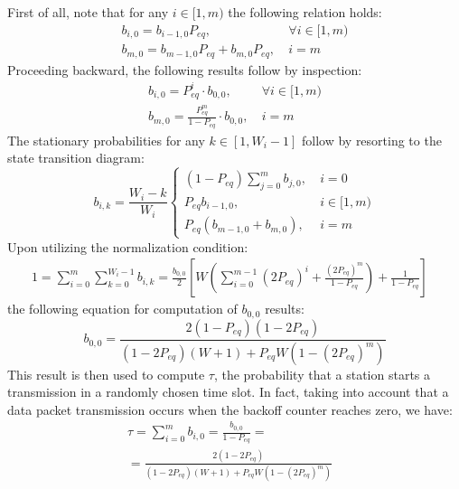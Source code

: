 \documentclass[10pt,onecolumn,a4paper]{IEEEtran}
\begin{document}
First of all, note that for any $i\in [1,m)$ the following
relation holds:
\begin{equation}\label{trans_states_probabilities_2way}
\begin{array}{ll}
b_{i,0}=b_{i-1,0}P_{eq},&~\forall i\in
[1,m)\\
b_{m,0}= b_{m-1,0}P_{eq}+b_{m,0}P_{eq},&~i=m
\end{array}
\end{equation}
Proceeding backward, the following results follow by inspection:
\begin{equation}\label{collision_probabilities_2way}
\begin{array}{ll}
b_{i,0}=P_{eq}^i\cdot b_{0,0},&~\forall i\in [1,m)\\
b_{m,0}=\frac{P_{eq}^m}{1-P_{eq}}\cdot b_{0,0},&~i=m
\end{array}
\end{equation}
The stationary probabilities for any $k\in[1,W_i-1]$ follow by
resorting to the state transition diagram:
\begin{equation}\label{eq.bik_2way}
b_{i,k} = \frac{W_i-k}{W_i}\left\{
\begin{array}{ll}
(1-P_{eq})\sum_{j=0}^m b_{j,0}, &~i=0\\
P_{eq}b_{i-1,0}, &~i\in [1,m)\\
P_{eq}(b_{m-1,0}+b_{m,0}), &~ i=m
\end{array} \right.
\end{equation}
Upon utilizing the normalization condition:
\begin{equation}
\begin{array}{ll}
1=\sum_{i=0}^m \sum_{k=0}^{W_i-1} b_{i,k}= \frac{b_{0,0}}{2}\left[
W\left( \sum_{i=0}^{m-1}(2P_{eq})^i+
\frac{(2P_{eq})^m}{1-P_{eq}}\right) +\frac{1}{1-P_{eq}}\right]&
\end{array}
\end{equation}
the following equation for computation of $b_{0,0}$ results:
\begin{equation}
b_{0,0}=
\frac{2(1-P_{eq})(1-2P_{eq})}{(1-2P_{eq})(W+1)+P_{eq}W\left(1-(2P_{eq})^m\right)}
\end{equation}
This result is then used to compute $\tau$, the probability that a
station starts a transmission in a randomly chosen time slot. In
fact, taking into account that a data packet transmission occurs
when the backoff counter reaches zero, we have:
\begin{equation}\begin{array}{ll}
\tau=\sum_{i=0}^m
b_{i,0}=\frac{b_{0,0}}{1-P_{eq}}=&\\
=\frac{2(1-2P_{eq})}{(1-2P_{eq})(W+1)+P_{eq}W(1-(2P_{eq})^m)}&
\end{array}
\end{equation}
\end{document}
